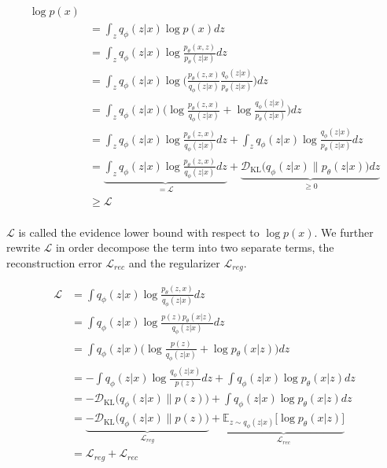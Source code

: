 \begin{align*}
  \log p(x)\\
  &= \int_z q_\phi(z|x) \log p(x) dz\\
  &= \int_z q_\phi(z|x) \log \frac{p_\theta(x,z)}{p_\theta(z|x)} dz \tag{Bayes' rule}\\
  &= \int_z q_\phi(z|x) \log\bigg(\frac{p_\theta(z,x)}{q_\phi(z|x)} \frac{q_\phi(z|x)}{p_\theta(z|x)}\bigg) dz \tag{Chain rule}\\
  &= \int_z q_\phi(z|x) \bigg(\log\frac{p_\theta(z,x)}{q_\phi(z|x)} + \log\frac{q_\phi(z|x)}{p_\theta(z|x)}\bigg) dz\\
  &= \int_z q_\phi(z|x) \log \frac{p_\theta(z,x)}{q_\phi(z|x)} dz + \int_z q_\phi(z|x) \log\frac{q_\phi(z|x)}{p_\theta(z|x)} dz\\
  &= \underbrace{\int_z q_\phi(z|x) \log \frac{p_\theta(z,x)}{q_\phi(z|x)} dz}_{= \mathcal{L}}+ \underbrace{\mathcal{D}_{\mathrm{KL}}\big(q_\phi(z|x) \| p_\theta(z|x)\big) dz}_{\geq 0}\\
  &\geq \mathcal{L}\\
\end{align*}

$\mathcal{L}$ is called the evidence lower bound with respect to $\log p(x)$.
We further rewrite $\mathcal{L}$ in order decompose the term into two separate terms, the reconstruction error $\mathcal{L}_{rec}$ and the regularizer $\mathcal{L}_{reg}$.

\begin{align*}
  \mathcal{L}
  &= \int q_\phi(z|x) \log\frac{p_\theta(z,x)}{q_\phi(z|x)} dz\\
  &= \int q_\phi(z|x) \log\frac{p(z) p_\theta(x|z)}{q_\phi(z|x)} \tag{we assume that x is conditionally dependent on z} dz\\
  &= \int q_\phi(z|x) \bigg(\log\frac{p(z)}{q_\phi(z|x)} + \log p_\theta(x|z)\bigg) dz\\
  &= -\int q_\phi(z|x) \log\frac{q_\phi(z|x)}{p(z)} dz + \int q_\phi(z|x) \log p_\theta(x|z) dz\\
  &= -\mathcal{D}_{\mathrm{KL}}\big(q_\phi(z|x) \| p(z)\big) + \int q_\phi(z|x) \log p_\theta(x|z) dz\\
  &= \underbrace{-\mathcal{D}_{\mathrm{KL}}\big(q_\phi(z|x) \| p(z)\big)}_{\mathcal{L}_{reg}} + \underbrace{\mathbb{E}_{z \sim q_\phi(z|x)}\big[ \log p_\theta(x|z)\big]}_{\mathcal{L}_{rec}}\\
  &= \mathcal{L}_{reg} + \mathcal{L}_{rec}
\end{align*}
